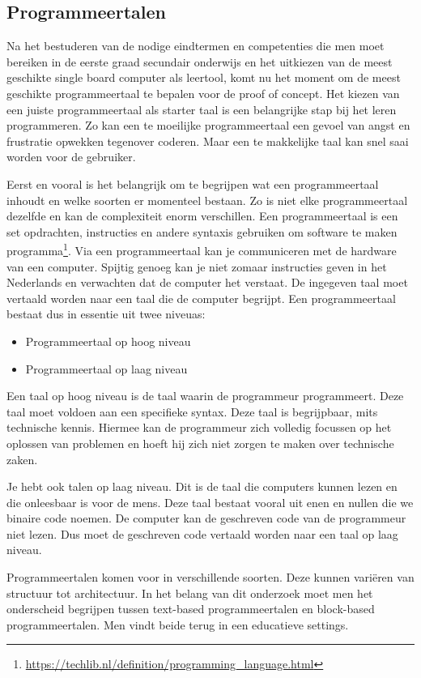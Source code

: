 \subsection{Programmeertalen}

Na het bestuderen van de nodige eindtermen en competenties die men moet bereiken in de eerste graad secundair onderwijs en het uitkiezen van de meest geschikte single board computer als leertool, komt nu het moment om de meest geschikte programmeertaal te bepalen voor de proof of concept. Het kiezen van een juiste programmeertaal als starter taal is een belangrijke stap bij het leren programmeren. Zo kan een te moeilijke programmeertaal een gevoel van angst en frustratie opwekken tegenover coderen. Maar een te makkelijke taal kan snel saai worden voor de gebruiker. 

Eerst en vooral is het belangrijk om te begrijpen wat een programmeertaal inhoudt en welke soorten er momenteel bestaan. Zo is niet elke programmeertaal dezelfde en kan de complexiteit enorm verschillen. 
Een programmeertaal is een set opdrachten, instructies en andere syntaxis gebruiken om software te maken programma\footnote{\url{https://techlib.nl/definition/programming_language.html}}. Via een programmeertaal kan je communiceren met de hardware van een computer. Spijtig genoeg kan je niet zomaar instructies geven in het Nederlands en verwachten dat de computer het verstaat. De ingegeven taal moet vertaald worden naar een taal die de computer begrijpt. Een programmeertaal bestaat dus in essentie uit twee niveuas: 
\begin{itemize}
    \item Programmeertaal op hoog niveau
    \item Programmeertaal op laag niveau
\end{itemize}
 Een taal op hoog niveau is de taal waarin de programmeur programmeert. Deze taal moet voldoen aan een specifieke syntax. Deze taal is begrijpbaar, mits technische kennis. Hiermee kan de programmeur zich volledig focussen op het oplossen van problemen en hoeft hij zich niet zorgen te maken over technische zaken. 
  
 Je hebt ook talen op laag niveau. Dit is de taal die computers kunnen lezen en die onleesbaar is voor de mens. Deze taal bestaat vooral uit enen en nullen die we binaire code noemen. De computer kan de geschreven code van de programmeur niet lezen. Dus moet de geschreven code vertaald worden naar een taal op laag niveau.

Programmeertalen komen voor in verschillende soorten. Deze kunnen variëren van structuur tot architectuur. In het belang van dit onderzoek moet men het onderscheid begrijpen tussen text-based programmeertalen en block-based programmeertalen. Men vindt beide terug in een educatieve settings.

